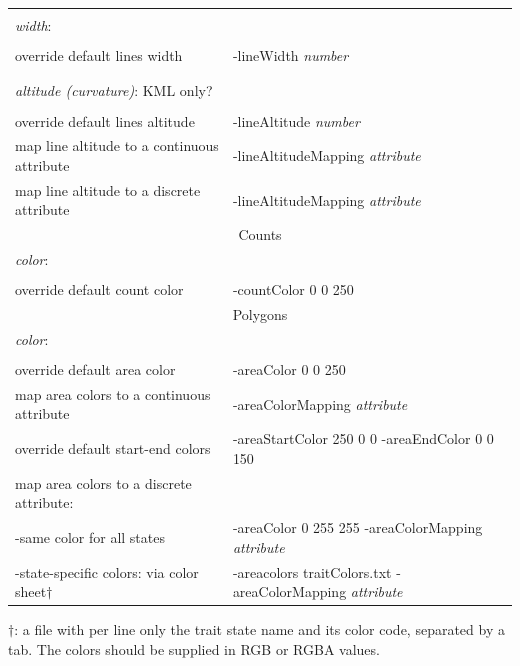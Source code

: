 \documentclass[english]{paper}
\begin{document}
\begin{table}
\begin{tabular}{ll}
								&														\\
\textit{width}:						&														\\
								&														\\
	override default lines width		&-lineWidth \textit{number}									\\
								&														\\
								&														\\
\textit{altitude (curvature)}:	KML only?	&														\\
								&														\\
override default lines altitude			&-lineAltitude  \textit{number}									\\
map line altitude to a continuous attribute	&-lineAltitudeMapping \textit{attribute}							\\
map line altitude to a discrete attribute	&-lineAltitudeMapping \textit{attribute}							\\
\midrule
			\multicolumn{2}{c}{Counts}														\\
\midrule
\textit{color}:						&														\\
								&														\\
override default count color			&	-countColor 0 0 250										\\
\midrule
			\multicolumn{2}{c}{Polygons}														\\
\midrule
\textit{color}:						&														\\
								&														\\
override default area color				& -areaColor 0 0 250											\\
map area colors to a continuous attribute 	& -areaColorMapping \textit{attribute}							\\
override default start-end colors		& -areaStartColor 250 0 0 -areaEndColor 0 0 150					\\
map area colors to a discrete attribute:	& 					 									\\
	-same color for all states			&-areaColor 0 255 255 -areaColorMapping \textit{attribute}			\\
	-state-specific colors: via color sheet$\dagger$&-areacolors traitColors.txt -areaColorMapping \textit{attribute}	\\
\bottomrule
\end{tabular}
\begin{flushleft}
{\footnotesize 
$\dagger$: a file with per line only the trait state name and its color code, separated by a tab. The colors should be supplied in RGB or RGBA values.
} 
\end{flushleft}
\label{tab:options}
\end{table}




\newpage

 
\end{document}
